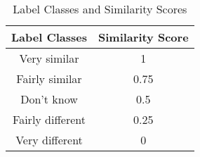 

\begin{table}[th]
\centering
\caption{Label Classes and Similarity Scores}
\label{tab:manualLabels}
\small{
\begin{tabular}{|c|c|}\hline
Label Classes   & Similarity Score\\\hline\hline
Very similar    &1\\
Fairly similar  &0.75\\
Don't know  &0.5\\
Fairly different    &0.25\\
Very different  &0\\\hline
\end{tabular}
}
\end{table}


